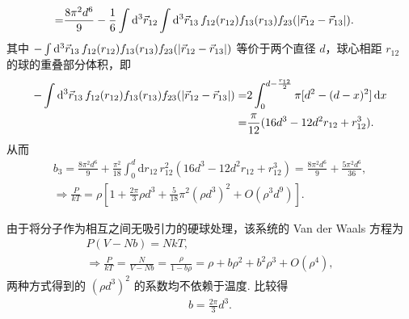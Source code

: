 \documentclass{assignment}
\begin{document}
\begin{pf}
\begin{align}
        =&\frac{8\pi^2d^6}{9}-\frac{1}{6}\int\mathrm{d}^3\vec{r}_{12}\int\mathrm{d}^3\vec{r}_{13}\,f_{12}(r_{12})f_{13}(r_{13})f_{23}(\left\lvert\vec{r}_{12}-\vec{r}_{13}\right\rvert).
    \end{align}
    其中 $-\int\mathrm{d}^3\vec{r}_{13}\,f_{12}(r_{12})f_{13}(r_{13})f_{23}(\left\lvert\vec{r}_{12}-\vec{r}_{13}\right\rvert)$ 等价于两个直径 $d$，球心相距 $r_{12}$ 的球的重叠部分体积，即
    \begin{align}
        \notag-\int\mathrm{d}^3\vec{r}_{13}\,f_{12}(r_{12})f_{13}(r_{13})f_{23}(\left\lvert\vec{r}_{12}-\vec{r}_{13}\right\rvert)=&2\int_0^{d-\frac{r_{12}}{2}}\pi[d^2-(d-x)^2]\,\mathrm{d}x\\
        =&\frac{\pi}{12}(16d^3-12d^2r_{12}+r_{12}^3).
    \end{align}
    从而
    \begin{gather}
        b_3=\frac{8\pi^2d^6}{9}+\frac{\pi^2}{18}\int_0^d\mathrm{d}r_{12}\,r_{12}^2(16d^3-12d^2r_{12}+r_{12}^3)=\frac{8\pi^2d^6}{9}+\frac{5\pi^2d^6}{36},\\
        \Longrightarrow\frac{P}{kT}=\rho\left[1+\frac{2\pi}{3}\rho d^3+\frac{5}{18}\pi^2(\rho d^3)^2+O(\rho^3d^9)\right].
    \end{gather}

    由于将分子作为相互之间无吸引力的硬球处理，该系统的 Van der Waals 方程为
    \begin{gather}
        P(V-Nb)=NkT,\\
        \Longrightarrow\frac{P}{kT}=\frac{N}{V-Nb}=\frac{\rho}{1-b\rho}=\rho+b\rho^2+b^2\rho^3+O(\rho^4),
    \end{gather}
    两种方式得到的 $(\rho d^3)^2$ 的系数均不依赖于温度.
    比较得
    \begin{align}
        b=\frac{2\pi}{3}d^3.
    \end{align}
\end{pf}
\end{document}
